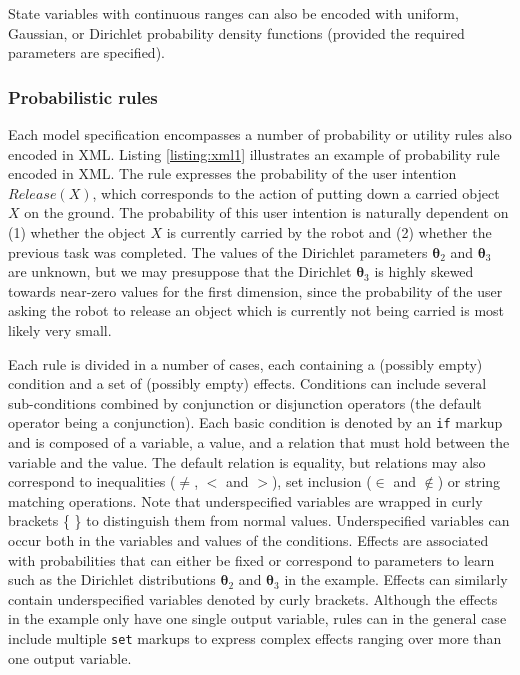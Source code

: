 State variables with continuous ranges can also be encoded with uniform, Gaussian, or Dirichlet probability density functions (provided the required parameters are specified). 

\subsubsection*{Probabilistic rules}

Each model specification encompasses a number of probability or utility rules also encoded in XML. Listing \ref{listing:xml1} illustrates an example of probability rule encoded in XML. The rule expresses the probability of the user intention $\mathit{Release}(X)$, which corresponds to the action of putting down a carried object $X$ on the ground.  The probability of this user intention is naturally dependent on (1) whether the object $X$ is currently carried by the robot and (2) whether the previous task was completed. The values of the Dirichlet parameters $\boldsymbol\theta_2$ and $\boldsymbol\theta_3$ are unknown, but we may presuppose that the Dirichlet $\boldsymbol\theta_3$ is highly skewed towards near-zero values for the first dimension, since the probability of the user asking the robot to release an object which is currently not being carried is most likely very small. 

Each rule is divided in a number of cases, each containing a (possibly empty) condition and a set of (possibly empty) effects.  Conditions can include several sub-conditions combined by conjunction or disjunction operators (the default operator being a conjunction). Each basic condition is denoted by an \texttt{if} markup and is composed of a variable, a value, and a  relation that must hold between the variable and the value. The default relation is equality, but relations may also correspond to inequalities ($\neq$, $<$ and $>$), set inclusion ($\in$ and $\notin$) or string matching operations.  Note that underspecified variables are wrapped in curly brackets \{ \} to distinguish them from normal values. Underspecified variables can occur both in the variables and values of the conditions. Effects are associated with probabilities that can either be fixed or correspond to parameters to learn such as the Dirichlet distributions $\boldsymbol\theta_2$ and $\boldsymbol\theta_3$ in the example. Effects can similarly contain underspecified variables denoted by curly brackets.  Although the effects in the example only have one single output variable, rules can in the general case include multiple \texttt{set} markups to express complex effects ranging over more than one output variable. 

